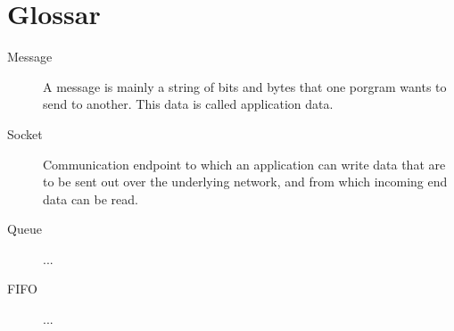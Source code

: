 \chapter{Glossar}

\begin{description}
  \item[Message] A message is mainly a string of bits and bytes that one porgram
wants to send to another. This data is called application data.  
  \item[Socket] Communication endpoint to which an application can write data
that are to be sent out over the underlying network, and from which incoming end
data can be read. \cite{TAN06}
  \item[Queue] ...
  \item[FIFO] ...
\end{description} 
